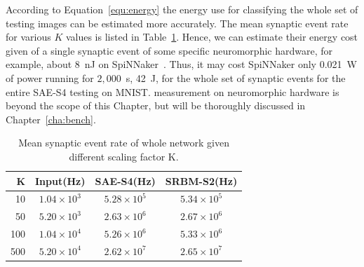 According to Equation~\ref{equ:energy} the energy use for classifying the whole set of testing images can be estimated more accurately.
The mean synaptic event rate for various $K$ values is listed in Table~\ref{tbl:fire_rate}.
Hence, we can estimate their energy cost given \DIFdelbegin {}\DIFdelend \DIFaddbegin {}\DIFaddend of a single synaptic event of some specific neuromorphic hardware, for example, about 8~nJ on SpiNNaker~\citep{stromatias2013power}.
Thus, it may cost SpiNNaker only 0.021~W of power running for $2,000$~s, 42~J, for the whole set of synaptic events for the entire SAE-S4 testing on MNIST.
\DIFdelbegin {}\DIFdelend \DIFaddbegin {}\DIFaddend measurement on neuromorphic hardware is beyond the scope of this Chapter, but will be thoroughly discussed in Chapter~\ref{cha:bench}.
\begin{table}[htbp]
	\centering
	\DIFdelbeginFL %
\DIFdelendFL \DIFaddbeginFL \caption[Mean synaptic event rate.]{\DIFaddendFL Mean synaptic event rate of whole network given different scaling factor K.}
	\bgroup
	\def\arraystretch{1.4}
	\begin{tabular}{r c c c}
		K & Input(Hz) & SAE-S4(Hz) & SRBM-S2(Hz)\\
		\hline
		10 & $1.04 \times 10^3$ & $5.28 \times 10^5$ & $5.34 \times 10^5$ \\
		50 & $5.20 \times 10^3$ & $2.63 \times 10^6$ & $2.67 \times 10^6$ \\
		100 & $1.04 \times 10^4$ & $5.26 \times 10^6$ & $5.33 \times 10^6$ \\
		500 & $5.20 \times 10^4$ & $2.62 \times 10^7$ & $2.65 \times 10^7$ \\
	\end{tabular}
	\egroup
	\DIFaddbeginFL \label{tbl:fire_rate}
\DIFaddendFL \end{table}

\DIFaddbegin \paragraph{\\}

